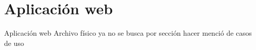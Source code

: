 \section{Aplicación web}

	Aplicación web
		Archivo físico
		ya no se busca por sección 
		hacer menció de casos de uso

